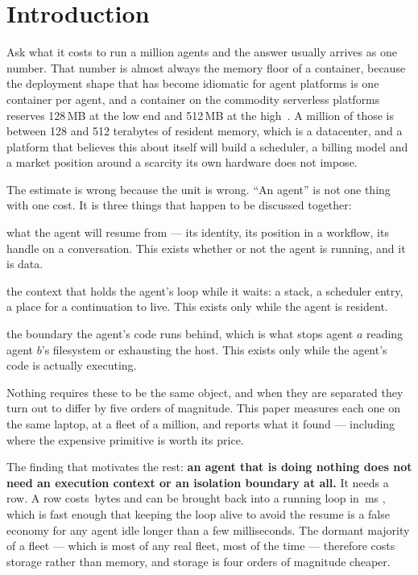 \section{Introduction}
\label{sec:intro}

Ask what it costs to run a million agents and the answer usually arrives as one
number. That number is almost always the memory floor of a container, because
the deployment shape that has become idiomatic for agent platforms is one
container per agent, and a container on the commodity serverless platforms
reserves 128\,MB at the low end and 512\,MB at the
high~\cite{modal,e2b,cfworkers}. A million of those is between 128 and 512
terabytes of resident memory, which is a datacenter, and a platform that
believes this about itself will build a scheduler, a billing model and a
market position around a scarcity its own hardware does not impose.

The estimate is wrong because the unit is wrong. ``An agent'' is not one thing
with one cost. It is three things that happen to be discussed together:

\begin{description}[leftmargin=1.4cm,style=nextline]
\item[State] what the agent will resume from --- its identity, its position in
  a workflow, its handle on a conversation. This exists whether or not the
  agent is running, and it is data.
\item[Execution] the context that holds the agent's loop while it waits: a
  stack, a scheduler entry, a place for a continuation to live. This exists
  only while the agent is resident.
\item[Isolation] the boundary the agent's code runs behind, which is what stops
  agent $a$ reading agent $b$'s filesystem or exhausting the host. This exists
  only while the agent's code is actually executing.
\end{description}

Nothing requires these to be the same object, and when they are separated they
turn out to differ by five orders of magnitude. This paper measures each one on
the same laptop, at a fleet of a million, and reports what it found --- including
where the expensive primitive is worth its price.

The finding that motivates the rest: \textbf{an agent that is doing nothing does
not need an execution context or an isolation boundary at all.} It needs a row.
A row costs \rFleetPer{}\,bytes \meas{} and can be brought back into a running
loop in \rFleetResume{}\,ms \meas{}, which is fast enough that keeping the loop
alive to avoid the resume is a false economy for any agent idle longer than a
few milliseconds. The dormant majority of a fleet --- which is most of any real
fleet, most of the time --- therefore costs storage rather than memory, and
storage is four orders of magnitude cheaper.

